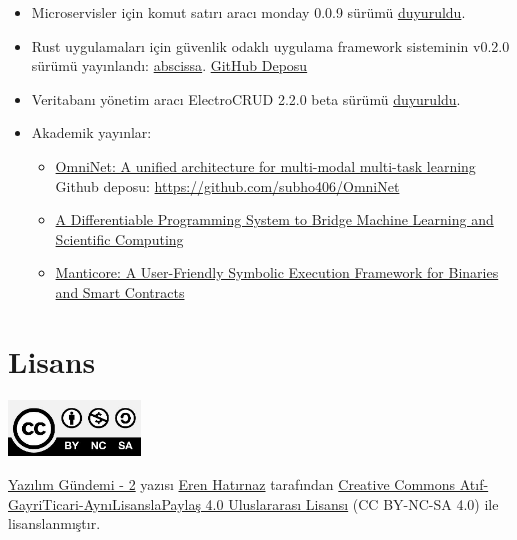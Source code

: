 \documentclass[11pt]{article}
\begin{document}
\begin{itemize}
\item Microservisler için komut satırı aracı monday 0.0.9 sürümü \href{https://github.com/eko/monday/releases/tag/0.0.9}{duyuruldu}.
\item Rust uygulamaları için güvenlik odaklı uygulama framework sisteminin v0.2.0
sürümü yayınlandı: \href{https://iqlusion.blog/introducing-abscissa-rust-application-framework}{abscissa}. \href{https://github.com/iqlusioninc/abscissa}{GitHub Deposu}
\item Veritabanı yönetim aracı ElectroCRUD 2.2.0 beta sürümü \href{https://github.com/garrylachman/ElectroCRUD/releases/tag/2.2.0-beta}{duyuruldu}.
\item Akademik yayınlar:
\begin{itemize}
\item \href{https://arxiv.org/abs/1907.07804}{OmniNet: A unified architecture for multi-modal multi-task learning} Github
deposu: \url{https://github.com/subho406/OmniNet}
\item \href{https://arxiv.org/abs/1907.07587}{A Differentiable Programming System to Bridge Machine Learning and
Scientific Computing}
\item \href{https://arxiv.org/abs/1907.03890}{Manticore: A User-Friendly Symbolic Execution Framework for Binaries and
Smart Contracts}
\end{itemize}
\end{itemize}
\section{Lisans}
\label{sec:orgf92bc7b}
\begin{center}
\begin{center}
\includegraphics[height=1.5cm]{../../../img/CC_BY-NC-SA_4.0.png}
\end{center}

\href{yazilim-gundemi-02.pdf}{Yazılım Gündemi - 2} yazısı \href{https://erenhatirnaz.github.io}{Eren Hatırnaz} tarafından \href{http://creativecommons.org/licenses/by-nc-sa/4.0/}{Creative Commons
Atıf-GayriTicari-AynıLisanslaPaylaş 4.0 Uluslararası Lisansı} (CC BY-NC-SA 4.0)
ile lisanslanmıştır.
\end{center}
\end{document}
